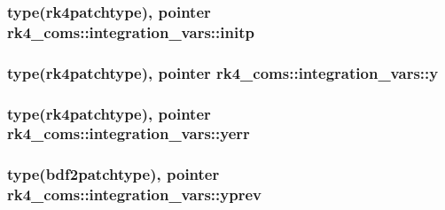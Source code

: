 \subsubsection[{initp}]{\setlength{\rightskip}{0pt plus 5cm}type({\bf rk4patchtype}), pointer rk4\+\_\+coms\+::integration\+\_\+vars\+::initp}\label{structrk4__coms_1_1integration__vars_a75f379d1970d5202750713a4c41f2677}
\hypertarget{structrk4__coms_1_1integration__vars_aa88675d2e80e0fdcbd23a575f937821d}{}
\subsubsection[{y}]{\setlength{\rightskip}{0pt plus 5cm}type({\bf rk4patchtype}), pointer rk4\+\_\+coms\+::integration\+\_\+vars\+::y}\label{structrk4__coms_1_1integration__vars_aa88675d2e80e0fdcbd23a575f937821d}
\hypertarget{structrk4__coms_1_1integration__vars_a7a0f408ecb7a7d0aa7b657134ffbbb2d}{}
\subsubsection[{yerr}]{\setlength{\rightskip}{0pt plus 5cm}type({\bf rk4patchtype}), pointer rk4\+\_\+coms\+::integration\+\_\+vars\+::yerr}\label{structrk4__coms_1_1integration__vars_a7a0f408ecb7a7d0aa7b657134ffbbb2d}
\hypertarget{structrk4__coms_1_1integration__vars_adba39929ddefffa3c1f201bc49647406}{}
\subsubsection[{yprev}]{\setlength{\rightskip}{0pt plus 5cm}type({\bf bdf2patchtype}), pointer rk4\+\_\+coms\+::integration\+\_\+vars\+::yprev}\label{structrk4__coms_1_1integration__vars_adba39929ddefffa3c1f201bc49647406}
\hypertarget{structrk4__coms_1_1integration__vars_ae6e62e452c7a2d6f61027f59c8de3b8c}{}
